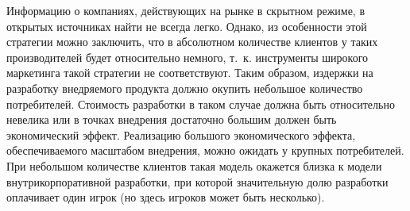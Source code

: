 \documentclass{article}
\begin{document}
Информацию о компаниях, действующих на рынке в скрытном режиме, в открытых источниках найти не всегда легко. Однако, из особенности этой стратегии можно заключить, что в абсолютном количестве клиентов у таких производителей будет относительно немного, т.~к. инструменты широкого маркетинга такой стратегии не соответствуют. Таким образом, издержки на разработку внедряемого продукта должно окупить небольшое количество потребителей. Стоимость разработки в таком случае должна быть относительно невелика или в точках внедрения достаточно большим должен быть экономический эффект. Реализацию большого экономического эффекта, обеспечиваемого масштабом внедрения, можно ожидать у крупных потребителей. При небольшом количестве клиентов такая модель окажется близка к модели внутрикорпоративной разработки, при которой значительную долю разработки оплачивает один игрок (но здесь игроков может быть несколько).
\end{document}
